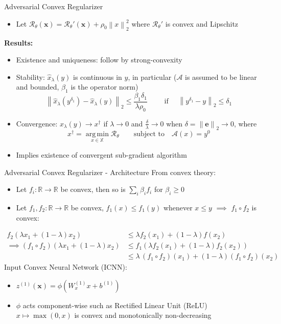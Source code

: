 \documentclass{beamer}
\newcommand{\norm}[1]{\left\lVert#1\right\rVert}
\DeclareMathOperator*{\argmin}{arg\,min}
\begin{document}
\begin{frame}{Adversarial Convex Regularizer}
\begin{itemize}
\item Let $\mathcal{R}_{\theta}(\pmb{x}) = \mathcal{R}_{\theta}'(\pmb{x}) + \rho_0 \norm{x}^{2}_{2}$ where $\mathcal{R}_{\theta}'$ is convex and Lipschitz
\end{itemize}
\centering
\vspace{.5cm}
{\bf Results:}
\begin{itemize}
\item Existence and uniqueness: follow by strong-convexity
\item Stability: $\hat{x}_{\lambda}(y)$ is continuous in $y$, in particular ($\mathcal{A}$ is assumed to be linear and bounded, $\beta_1$ is the operator norm)
$$
\norm{\hat{x}_{\lambda}(y^{\delta_1}) - \hat{x}_{\lambda}(y)}_{2} \leq
\frac{\beta_1 \delta_1}{\lambda \rho_0}
\qquad \text{ if } \quad \norm{y^{\delta_1} - y}_{2} \leq \delta_1
$$
\item Convergence: $\hat{x}_{\lambda}(y) \rightarrow x^{\dagger}$ if $\lambda \rightarrow 0$ and $\frac{\delta}{\lambda} \rightarrow 0$ when $\delta = \norm{\pmb{e}}_{2} \rightarrow 0$, where
$$
x^{\dagger} = \argmin\limits_{x \in \mathbb{X}} \mathcal{R}_{\theta}
\qquad \text{subject to} \quad \mathcal{A}(x) = y^{0}
$$
\item Implies existence of convergent sub-gradient algorithm
\end{itemize}
\end{frame}

\begin{frame}{Adversarial Convex Regularizer - Architecture}
From convex theory:
\begin{itemize}
\item Let $f_i: \mathbb{R} \rightarrow \mathbb{R}$ be convex, then so is
$\sum_{i} \beta_i f_i $ for $\beta_i \geq 0$
\item Let $f_1, f_2: \mathbb{R} \rightarrow \mathbb{R}$ be convex, $f_1(x) \leq f_1(y)$ whenever $x \leq y$ $\implies$ $f_1 \circ f_2$ is convex:
\end{itemize}
\begin{align*}
f_2(\lambda x_1 + (1-\lambda)x_2) &\leq 
\lambda f_2(x_1) + (1-\lambda)f(x_2) \\[.5em]
\implies (f_1 \circ f_2) (\lambda x_1 + (1-\lambda)x_2) &\leq 
f_1(\lambda f_2(x_1) + (1 - \lambda)f_2(x_2))  \\[.5em]
&\leq \lambda \, (f_1 \circ f_2) (x_1) + (1 - \lambda) (f_1 \circ f_2)(x_2)
\end{align*}
Input Convex Neural Network (ICNN):
\begin{itemize}
\item $z^{(1)}(\pmb{x}) = \phi \left( W_{x}^{(1)}x + b^{(1)}  \right)$ 
\item $\phi$ acts component-wise such as Rectified Linear Unit (ReLU) $x \mapsto \max(0, x)$ is convex and monotonically non-decreasing
\end{itemize}
\end{frame}
\end{document}
